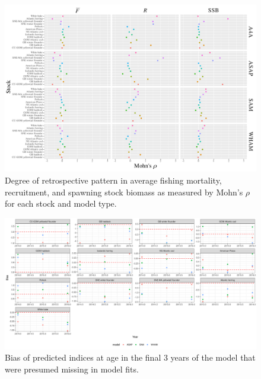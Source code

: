 \documentclass[12pt,letterpaper, leqno]{article}
\begin{document}
\begin{landscape}


\begin{figure}
\caption{Degree of retrospective pattern in average fishing mortality, recruitment, and spawning stock biomass as measured by Mohn's $\rho$ for each stock and model type.}\label{rho_paper_plot}
\begin{center}
\includegraphics[height = 0.9\textheight]{../db/rho_paper_plot.pdf}
\end{center}
\end{figure}


\begin{figure}
\caption{Bias of predicted indices at age in the final 3 years of the model that were presumed missing in model fits.}\label{predmissing_biasplot}
\begin{center}
\includegraphics[height = 0.8\textheight]{../db/predmissing_biasplot.png}
\end{center}
\end{figure}


\end{landscape}
\end{document}
